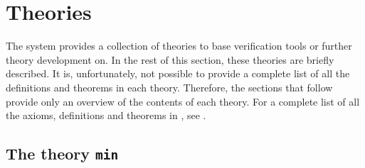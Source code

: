 \chapter{Theories}\label{HOLtheories}

%



\setcounter{sessioncount}{0}


\newcommand{\konst}[1]{\ensuremath{\mbox{\small{\textbf{\sf{#1}}}}}}
\newcommand{\nil}{\mathbf{[} \;\mathbf{]}}
\newcommand{\cons}[2]{{#1}\mathbf{:}\mathbf{:}{#2}}

 The \HOL{} system provides a collection of theories to base
verification tools or further theory development on.  In the rest of
this section, these theories are briefly described.  It is,
unfortunately, not possible to provide a complete list of all the
definitions and theorems in each theory. Therefore, the sections that
follow provide only an overview of the contents of each theory.  For a
complete list of all the axioms, definitions and theorems in \HOL, see
\REFERENCE.


\section{The theory {\tt min}}\label{minTheory}

